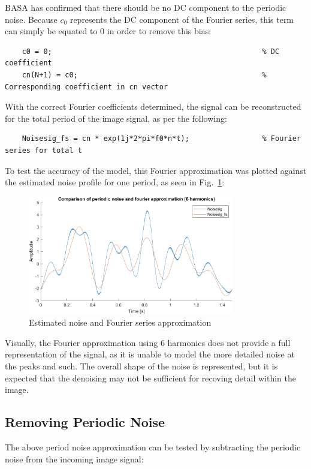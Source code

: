 \documentclass[12pt]{article}
\numberwithin{equation}{section}
\numberwithin{figure}{section}
\numberwithin{table}{section}
\begin{document}
BASA has confirmed that there should be no DC component to the periodic noise.
Because $c_0$ represents the DC component of the Fourier series, this term can
simply be equated to 0 in order to remove this bias:

\begin{verbatim}
    c0 = 0;                                                 % DC coefficient
    cn(N+1) = c0;                                           % Corresponding coefficient in cn vector 
\end{verbatim}

With the correct Fourier coefficients determined, the signal can be
reconstructed for the total period of the image signal, as per the following:
\begin{verbatim}
    Noisesig_fs = cn * exp(1j*2*pi*f0*n*t);                 % Fourier series for total t
\end{verbatim}

To test the accuracy of the model, this Fourier approximation was plotted
against the estimated noise profile for one period, as seen in
Fig.~\ref{fig:p2-noisefscomp}:

\begin{figure}[h]
    \centering
    \includegraphics[width=9cm]{figures/p2-noisefscomp.png}
    \caption{Estimated noise and Fourier series approximation\label{fig:p2-noisefscomp}}
\end{figure}

Visually, the Fourier approximation using 6 harmonics does not provide a full
representation of the signal, as it is unable to model the more detailed noise
at the peaks and such. The overall shape of the noise is represented, but it is
expected that the denoising may not be sufficient for recoving detail within
the image.
\subsection{Removing Periodic Noise}
The above period noise approximation can be tested by subtracting the periodic
noise from the incoming image signal:
\end{document}
